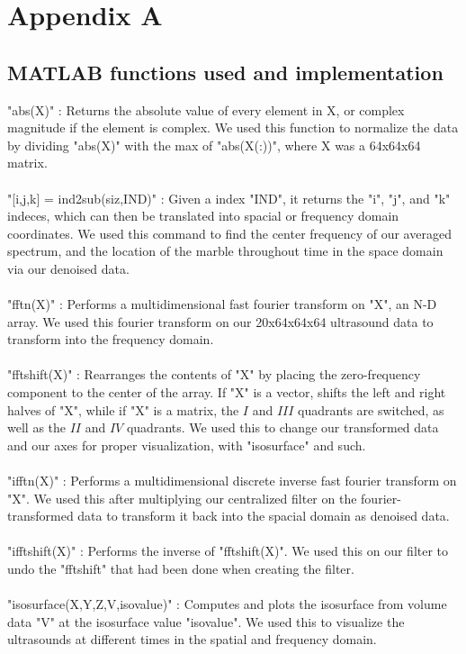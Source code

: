 \documentclass{article}
\begin{document}
\section*{\fontsize{19}{15}\selectfont Appendix A}
\subsection*{MATLAB functions used and implementation}
"abs(X)" : Returns the absolute value of every element in X, or complex magnitude if the element is complex. We used this function to normalize the data by dividing "abs(X)" with the max of "abs(X(:))", where X was a 64x64x64 matrix. \\ \\
"[i,j,k] = ind2sub(siz,IND)" : Given a index "IND", it returns the "i", "j", and "k" indeces, which can then be translated into spacial or frequency domain coordinates. We used this command to find the center frequency of our averaged spectrum, and the location of the marble throughout time in the space domain via our denoised data. \\ \\
"fftn(X)" : Performs a multidimensional fast fourier transform on "X", an N-D array. We used this fourier transform on our 20x64x64x64 ultrasound data to transform into the frequency domain. \\ \\
"fftshift(X)" : Rearranges the contents of "X" by placing the zero-frequency component to the center of the array. If "X" is a vector, shifts the left and right halves of "X", while if "X" is a matrix, the $I$ and $III$ quadrants are switched, as well as the $II$ and $IV$ quadrants. We used this to change our transformed data and our axes for proper visualization, with "isosurface" and such.  \\ \\
"ifftn(X)" : Performs a multidimensional discrete inverse fast fourier transform on "X". We used this after multiplying our centralized filter on the fourier-transformed data to transform it back into the spacial domain as denoised data.\\ \\
"ifftshift(X)" : Performs the inverse of "fftshift(X)". We used this on our filter to undo the "fftshift" that had been done when creating the filter. \\ \\
"isosurface(X,Y,Z,V,isovalue)" : Computes and plots the isosurface from volume data "V" at the isosurface value "isovalue". We used this to visualize the ultrasounds at different times in the spatial and frequency domain.\\ \\
\end{document}
